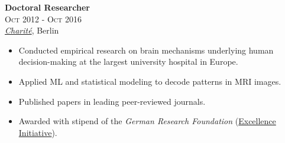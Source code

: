 \documentclass[a4paper,9.5pt]{article}
\begin{document}
\begin{minipage}[t]{0.65\textwidth}
\textbf{Doctoral Researcher}\\
\textsc{Oct 2012 - Oct 2016}\\
\emph{\href{https://mindandbrain.charite.de/en}{Charité}}, Berlin
\vspace{1mm}
\begin{itemize}[leftmargin=1em, itemsep=1mm, parsep=0.5mm]
  \item Conducted empirical research on brain mechanisms underlying human decision-making at the largest university hospital in Europe.
  \item Applied ML and statistical modeling to decode patterns in MRI images.
  \item Published papers in leading peer-reviewed journals. %
  \item Awarded with stipend of the \textit{German Research Foundation} (\href{https://www.dfg.de/en/research_funding/programmes/excellence_initiative/index.html}{Excellence Initiative}).
\end{itemize}

\end{minipage}
\end{document}
